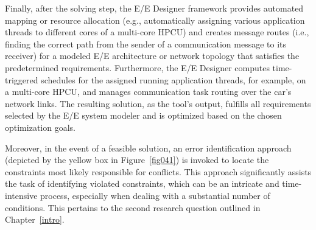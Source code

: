     Finally, after the solving step, the E/E Designer framework provides automated mapping or resource allocation (e.g., automatically assigning various application threads to different cores of a multi-core HPCU) and creates message routes (i.e., finding the correct path from the sender of a communication message to its receiver) for a modeled E/E architecture or network topology that satisfies the predetermined requirements. Furthermore, the E/E Designer computes time-triggered schedules for the assigned running application threads, for example, on a multi-core HPCU, and manages communication task routing over the car's network links. The resulting solution, as the tool's output, fulfills all requirements selected by the E/E system modeler and is optimized based on the chosen optimization goals.
    

    
    Moreover, in the event of a feasible solution, an error identification approach (depicted by the yellow box in Figure~\ref{fig041}) is invoked to locate the constraints most likely responsible for conflicts. This approach significantly assists the task of identifying violated constraints, which can be an intricate and time-intensive process, especially when dealing with a substantial number of conditions. This pertains to the second research question outlined in Chapter~\ref{intro}.

   
